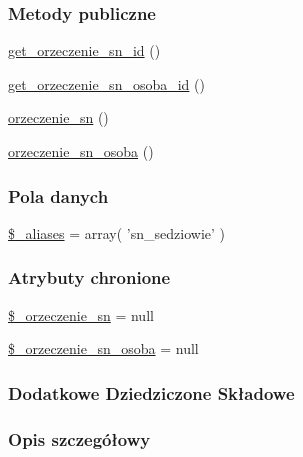 \subsubsection*{Metody publiczne}
\begin{DoxyCompactItemize}
\item 
\hyperlink{classep___s_n___orzeczenie___sedzia_a48819f0e56cb11707ba89150dd449c71}{get\-\_\-orzeczenie\-\_\-sn\-\_\-id} ()
\item 
\hyperlink{classep___s_n___orzeczenie___sedzia_a8a91a727290a24c4f12d72adda38d3df}{get\-\_\-orzeczenie\-\_\-sn\-\_\-osoba\-\_\-id} ()
\item 
\hyperlink{classep___s_n___orzeczenie___sedzia_ad3ca9a024234af7b90b52e8edb3406ff}{orzeczenie\-\_\-sn} ()
\item 
\hyperlink{classep___s_n___orzeczenie___sedzia_abedbfb98ce259de97cc4ddfd5496797c}{orzeczenie\-\_\-sn\-\_\-osoba} ()
\end{DoxyCompactItemize}
\subsubsection*{Pola danych}
\begin{DoxyCompactItemize}
\item 
\hyperlink{classep___s_n___orzeczenie___sedzia_ab4e31d75f0bc5d512456911e5d01366b}{\$\-\_\-aliases} = array( 'sn\-\_\-sedziowie' )
\end{DoxyCompactItemize}
\subsubsection*{Atrybuty chronione}
\begin{DoxyCompactItemize}
\item 
\hyperlink{classep___s_n___orzeczenie___sedzia_a03da9aa4f10fbe1d2b4ef32521cbedb0}{\$\-\_\-orzeczenie\-\_\-sn} = null
\item 
\hyperlink{classep___s_n___orzeczenie___sedzia_a9ede817d229955b98ebe3e10f5a45e94}{\$\-\_\-orzeczenie\-\_\-sn\-\_\-osoba} = null
\end{DoxyCompactItemize}
\subsubsection*{Dodatkowe Dziedziczone Składowe}


\subsubsection{Opis szczegółowy}


